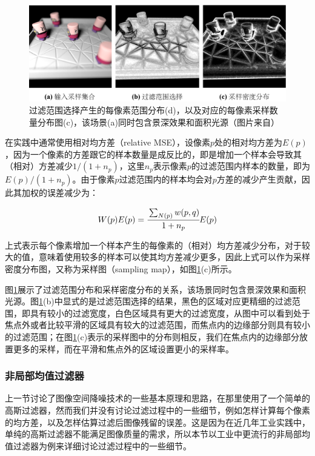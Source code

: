 \begin{figure}
	\includegraphics[width=1.0\textwidth]{figures/pt/denoising-results}
	\caption{过滤范围选择产生的每像素范围分布(d)，以及对应的每像素采样数量分布图(c)，该场景(a)同时包含景深效果和面积光源（图片来自\cite{a:AdaptiveRenderingaposteriorimethods}）}
	\label{f:pt-denoising-results}
\end{figure}

在实践中通常使用相对均方差（relative MSE），设像素$p$处的相对均方差为$E(p)$，因为一个像素的方差跟它的样本数量是成反比的，即是增加一个样本会导致其（相对）方差减少$1/(1+n_p)$，这里$n_p$表示像素$p$的过滤范围内样本的数量，即为$E(p)/(1+n_p)$。由于像素$p$过滤范围内的样本均会对$p$方差的减少产生贡献，因此其加权的误差减少为：

\begin{equation}
	W(p)E(p)= \cfrac{\sum\nolimits_{N(p)}w(p,q)}{1+n_p}E(p)
\end{equation}

\noindent 上式表示每个像素增加一个样本产生的每像素的（相对）均方差减少分布，对于较大的值，意味着使用较多的样本可以使其均方差减少更多，因此上式可以作为采样密度分布图，又称为采样图（sampling map），如图\ref{f:pt-denoising-results}(c)所示。

图\ref{f:pt-denoising-results}展示了过滤范围分布和采样密度分布的关系，该场景同时包含景深效果和面积光源。图\ref{f:pt-denoising-results}(b)中显式的是过滤范围选择的结果，黑色的区域对应更精细的过滤范围，即具有较小的过滤宽度，白色区域具有更大的过滤宽度，从图中可以看到处于焦点外或者比较平滑的区域具有较大的过滤范围，而焦点内的边缘部分则具有较小的过滤范围；在图\ref{f:pt-denoising-results}(c)表示的采样图中的分布则相反，我们在焦点内的边缘部分放置更多的采样，而在平滑和焦点外的区域设置更小的采样率。







\subsubsection{非局部均值过滤器 }\label{sec:pt-image-processing}
上一节讨论了图像空间降噪技术的一些基本原理和思路，在那里使用了一个简单的高斯过滤器，然而我们并没有讨论过滤过程中的一些细节，例如怎样计算每个像素的均方差，以及怎样估算过滤后图像残留的误差。这是因为在近几年工业实践中，单纯的高斯过滤器不能满足图像质量的需求，所以本节以工业中更流行的非局部均值过滤器为例来详细讨论过滤过程中的一些细节。

